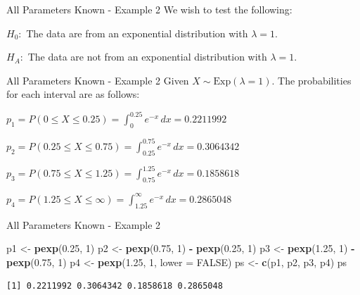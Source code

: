 \documentclass[
  ignorenonframetext,
]{beamer}
\newenvironment{Shaded}{\begin{snugshade}}{\end{snugshade}}
\newcommand{\AttributeTok}[1]{\textcolor[rgb]{0.13,0.29,0.53}{#1}}
\newcommand{\ConstantTok}[1]{\textcolor[rgb]{0.56,0.35,0.01}{#1}}
\newcommand{\DecValTok}[1]{\textcolor[rgb]{0.00,0.00,0.81}{#1}}
\newcommand{\FloatTok}[1]{\textcolor[rgb]{0.00,0.00,0.81}{#1}}
\newcommand{\FunctionTok}[1]{\textcolor[rgb]{0.13,0.29,0.53}{\textbf{#1}}}
\newcommand{\NormalTok}[1]{#1}
\newcommand{\OtherTok}[1]{\textcolor[rgb]{0.56,0.35,0.01}{#1}}
\newcommand{\SpecialCharTok}[1]{\textcolor[rgb]{0.81,0.36,0.00}{\textbf{#1}}}
\begin{document}
\begin{frame}{All Parameters Known - Example 2}
\protect\hypertarget{all-parameters-known---example-2-1}{}
We wish to test the following:

\begin{tcolorbox}
$H_0:$ The data are from an exponential distribution with $\lambda = 1$.

$H_A:$ The data are not from an exponential distribution with $\lambda = 1$.
\end{tcolorbox}
\end{frame}

\begin{frame}{All Parameters Known - Example 2}
\protect\hypertarget{all-parameters-known---example-2-2}{}
Given \(X \sim \text{Exp}(\lambda = 1)\). The probabilities for each
interval are as follows:

\(p_1 = P(0 \leq X \leq 0.25)=\int_0^{0.25}e^{-x}\,dx =0.2211992\)

\(p_2 = P(0.25 \leq X \leq 0.75)=\int_{0.25}^{0.75}e^{-x}\,dx =0.3064342\)

\(p_3 = P(0.75 \leq X \leq 1.25)=\int_{0.75}^{1.25}e^{-x}\,dx =0.1858618\)

\(p_4 = P(1.25 \leq X \leq \infty)=\int_{1.25}^{\infty}e^{-x}\,dx =0.2865048\)
\end{frame}

\begin{frame}[fragile]{All Parameters Known - Example 2}
\protect\hypertarget{all-parameters-known---example-2-3}{}
\begin{Shaded}
\begin{Highlighting}[]
\NormalTok{p1 }\OtherTok{\textless{}{-}} \FunctionTok{pexp}\NormalTok{(}\FloatTok{0.25}\NormalTok{, }\DecValTok{1}\NormalTok{)}
\NormalTok{p2 }\OtherTok{\textless{}{-}} \FunctionTok{pexp}\NormalTok{(}\FloatTok{0.75}\NormalTok{, }\DecValTok{1}\NormalTok{) }\SpecialCharTok{{-}} \FunctionTok{pexp}\NormalTok{(}\FloatTok{0.25}\NormalTok{, }\DecValTok{1}\NormalTok{)}
\NormalTok{p3 }\OtherTok{\textless{}{-}} \FunctionTok{pexp}\NormalTok{(}\FloatTok{1.25}\NormalTok{, }\DecValTok{1}\NormalTok{) }\SpecialCharTok{{-}} \FunctionTok{pexp}\NormalTok{(}\FloatTok{0.75}\NormalTok{, }\DecValTok{1}\NormalTok{)}
\NormalTok{p4 }\OtherTok{\textless{}{-}} \FunctionTok{pexp}\NormalTok{(}\FloatTok{1.25}\NormalTok{, }\DecValTok{1}\NormalTok{, }\AttributeTok{lower =} \ConstantTok{FALSE}\NormalTok{)}
\NormalTok{ps }\OtherTok{\textless{}{-}} \FunctionTok{c}\NormalTok{(p1, p2, p3, p4)}
\NormalTok{ps}
\end{Highlighting}
\end{Shaded}

\begin{verbatim}
[1] 0.2211992 0.3064342 0.1858618 0.2865048
\end{verbatim}
\end{frame}
\end{document}
